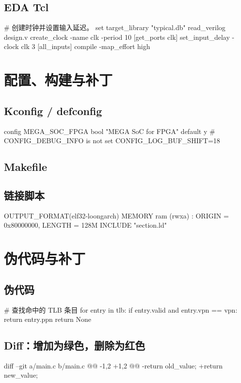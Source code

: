 \documentclass[10pt,letterpaper]{book}
\begin{document}
\subsection*{EDA Tcl}
\begin{CodeBlock}[language=BookTcl]
# 创建时钟并设置输入延迟。
set target_library "typical.db"
read_verilog design.v
create_clock -name clk -period 10 [get_ports clk]
set_input_delay -clock clk 3 [all_inputs]
compile -map_effort high
\end{CodeBlock}

\clearpage
\section*{配置、构建与补丁}
\subsection*{Kconfig / defconfig}
\begin{CodeBlock}[language=BookConfig]
config MEGA_SOC_FPGA
    bool "MEGA SoC for FPGA"
    default y
# CONFIG_DEBUG_INFO is not set
CONFIG_LOG_BUF_SHIFT=18
\end{CodeBlock}

\subsection*{Makefile}

\subsection*{链接脚本}
\begin{CodeBlock}[language=BookLinker]
OUTPUT_FORMAT(elf32-loongarch)
MEMORY {
  ram (rwxa) : ORIGIN = 0x80000000, LENGTH = 128M
}
INCLUDE "section.ld"
\end{CodeBlock}

\clearpage
\section*{伪代码与补丁}
\subsection*{伪代码}
\begin{CodeBlock}[language=BookPseudo]
# 查找命中的 TLB 条目
for entry in tlb:
    if entry.valid and entry.vpn == vpn:
        return entry.ppn
return None
\end{CodeBlock}

\subsection*{Diff：增加为绿色，删除为红色}
\begin{CodeBlock}[language=BookDiff]
diff --git a/main.c b/main.c
@@ -1,2 +1,2 @@
-return old_value;
+return new_value;
\end{CodeBlock}
\end{document}
